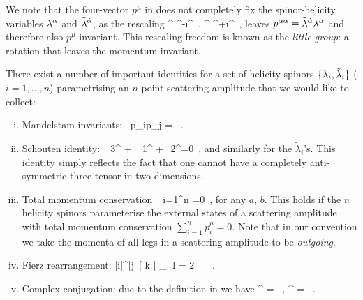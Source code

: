 %
%
We note that the four-vector $p^{\mu}$ in  does not completely fix the spinor-helicity variables $\lambda^{\alpha}$ and $\tilde\lambda^{{\dot{\alpha}}}$, as the rescaling 
%
\be \label{eq:little_group}
\la^{\a} \to {}^{-\i\varphi}\la^{\a}\, , \qquad
\tla^{\da} \to {}^{+\i\varphi}\tla^{\da}\, , 
\ee
%
leaves $p^{{\dot{\alpha}}\alpha}= \tilde\lambda^{{\dot{\alpha}}}\lambda^{\alpha}$ and therefore also $p^{\mu}$ invariant. 
This rescaling freedom is known as the \emph{little group}: a rotation that leaves the
momentum invariant.
%


There exist a number of important identities for a set of helicity spinors
$\{\lambda_{i},\tilde\lambda_{i}\}$ ($i=1,\ldots,n$) parametrising an $n$-point scattering amplitude that we would like to collect:
\begin{enumerate}[i)]
\item Mandelstam invariants:  \, p_{i}\cdot p_{j} = \, . \ee

\smallskip
\item Schouten identity: 
\be \label{eq:Schouten}
\la_{3}^{\a} + \la_{1}^{\a}
+\la_{2}^{\a}=0\, ,\ee
and similarly for the $\tilde{\lambda}_i$'s.
This identity simply reflects the fact that one cannot have a completely anti-symmetric three-tensor in two-dimensions. 

\smallskip
\item Total momentum conservation \be\sum_{i=1}^{n} =0\, , \ee
for any $a$, $b$. This holds if the $n$ helicity spinors parameterise the external states of a scattering amplitude  with total momentum conservation $\sum_{i=1}^{n}p_{i}^{\mu}=0$. 
Note that in our convention we take the momenta of all legs in a scattering amplitude to be \emph{outgoing}.

\smallskip
\item Fierz rearrangement:
\be \label{eq:Fierz}
[i|\gamma^{\mu}|j\rangle \, [ k | \gamma_{\mu}| l \rangle = 2 \, \, \, .
\ee
\item Complex conjugation: due to the definition in  we have
\be
{}^{\ast} = \, , \qquad 
{}^{\ast} = \, .
\ee
\end{enumerate}
%

